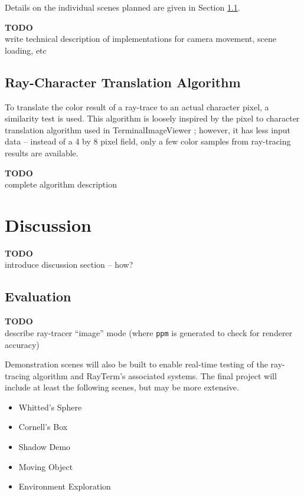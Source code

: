 \documentclass[11pt]{article}
\newcommand{\name}{{\sc RayTerm}}
\newcommand\todo[1]{
\begin{center}
  \color{red}
  {\bf TODO}\\
  #1
\end{center}
}
\begin{document}
Details on the individual scenes planned are given in Section \ref{sec:evaluate}.

\todo{write technical description of implementations for camera movement, scene loading, etc}

\subsection{Ray-Character Translation Algorithm}
\label{sec:method:ray_character_algorithm}

To translate the color result of a ray-trace to an actual character pixel, a similarity test is used.
This algorithm is loosely inspired by the pixel to character translation algorithm used in TerminalImageViewer \cite{tivGithub}; however, it has less input data -- instead of a 4 by 8 pixel field, only a few color samples from ray-tracing results are available.

\todo{complete algorithm description}

\section{Discussion}
\label{sec:discussion}

\todo{introduce discussion section -- how?}

\subsection{Evaluation}
\label{sec:evaluate}


\todo{describe ray-tracer ``image'' mode (where \texttt{ppm} is generated to check for renderer accuracy)}


Demonstration scenes will also be built to enable real-time testing of the ray-tracing algorithm and \name's associated systems. The final project will include at least the following scenes, but may be more extensive.

\begin{itemize}
  \setlength\itemsep{-0.25em}
  \item Whitted's Sphere
  \item Cornell's Box
  \item Shadow Demo
  \item Moving Object
  \item Environment Exploration
\end{itemize}
\end{document}
